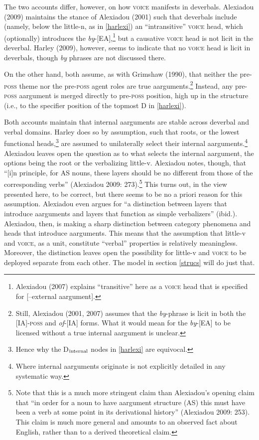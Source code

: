 \documentclass[12pt]{article}
\newcommand*{\textsub}[1]{\ensuremath{_\textrm{{\scriptsize #1}}}}
\begin{document}
The two accounts differ, however, on how \textsc{voice} manifests in deverbals. Alexiadou (2009) maintains the stance of Alexiadou (2001) such that deverbals include (namely, below the little-n, as in \ref{harlexi}) an ``intransitive'' \textsc{voice} head, which (optionally) introduces the \textit{by}-[EA],\footnote{ Alexiadou (2007) explains ``transitive'' here as a \textsc{voice} head that is specified for [--external aargument].} but a causative \textsc{voice} head is not licit in the deverbal. Harley (2009), however, seems to indicate that no \textsc{voice} head is licit in deverbals, though \textit{by} phrases are not discussed there. 

On the other hand, both assume, as with Grimshaw (1990), that neither the pre-\textsc{poss} theme nor the pre-\textsc{poss} agent roles are true aarguments.\footnote{ Still, Alexiadou (2001, 2007) assumes that the \textit{by}-phrase is licit in both the [IA]-\textsc{poss} and \textit{of}-[IA] forms. What it would mean for the \textit{by}-[EA] to be licensed without a true internal aargument is unclear.} Instead, any pre-\textsc{poss} aargument is merged directly to pre-\textsc{poss} position, high up in the structure (i.e., to the specifier position of the topmost D in \ref{harlexi}). 

Both accounts maintain that internal aarguments are stable across deverbal and verbal domains. Harley does so by assumption, such that roots, or the lowest functional heads,\footnote{ Hence why the D\textsub{internal} nodes in \ref{harlexi} are equivocal.} are assumed to unilaterally select their internal aarguments.\footnote{ Where internal aarguments originate is not explicitly detailed in any systematic way.} Alexiadou leaves open the question as to what selects the internal aargument, the options being the root or the verbalizing little-v. Alexiadou notes, though, that ``[i]n principle, for AS nouns, these layers should be no different from those of the corresponding verbs'' (Alexiadou 2009: 273).\footnote{ Note that this is a much more stringent claim than Alexiadou's opening claim that ``in order for a noun to have aargument structure (AS) this must have been a verb at some point in its derivational history'' (Alexiadou 2009: 253). This claim is much more general and amounts to an observed fact about English, rather than to a derived theoretical claim.} This turns out, in the view presented here, to be correct, but there seems to be no a priori reason for this assumption. Alexiadou even argues for ``a distinction between layers that introduce aarguments and layers that function as simple verbalizers'' (ibid.). Alexiadou, then, is making a sharp distinction between category phenomena and heads that introduce aarguments. This means that the assumption that little-v and \textsc{voice}, as a unit, constitute ``verbal'' properties is relatively meaningless. Moreover, the distinction leaves open the possibility for little-v and \textsc{voice} to be deployed separate from each other. The model in section \ref{strucs} will do just that.
\end{document}
